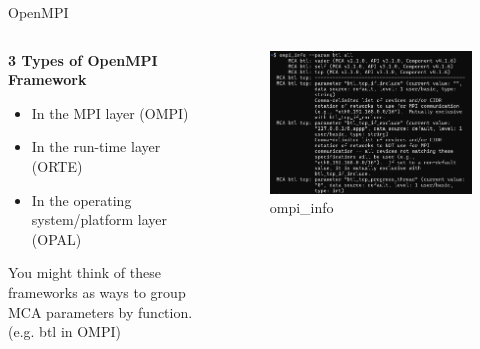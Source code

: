 \begin{frame}{OpenMPI}
\begin{columns}
    \begin{column}{.5 \textwidth}

    \textbf{\small 3 Types of OpenMPI Framework}

    \begin{itemize}
        \item In the MPI layer (OMPI)
        \item In the run-time layer (ORTE)
        \item In the operating system/platform layer (OPAL)
    \end{itemize}


    You might think of these frameworks as ways to group MCA parameters by function. (e.g. btl in OMPI)

    
    \end{column}

    \begin{column}{.5 \textwidth}
        \begin{figure}
            \centering
            \includegraphics[width=1\linewidth]{day8_am/img/mpi/ompi_info.png}
            \caption{ompi\_info}
            \label{fig:ompi_info}
        \end{figure}
    \end{column}    
\end{columns}
\end{frame}

